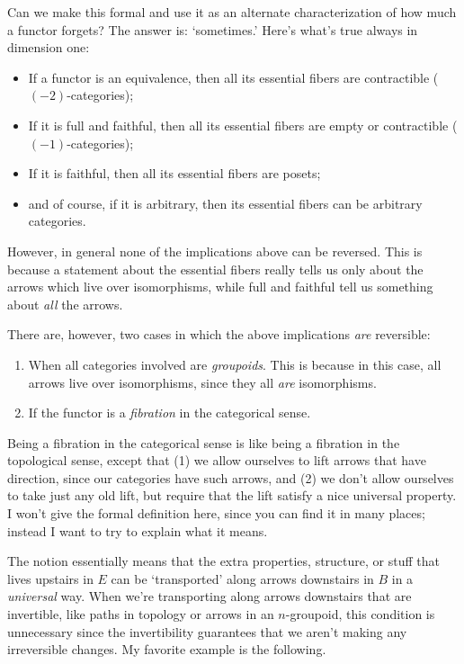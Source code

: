 \documentclass[12pt]{amsart}
\begin{document}
Can we make this formal and use it as an alternate characterization of
how much a functor forgets?  The answer is: `sometimes.'  Here's
what's true always in dimension one:

\begin{itemize}
\item If a functor is an equivalence, then all its essential fibers
  are contractible ($(-2)$-categories);
\item If it is full and faithful, then all its essential fibers are empty
  or contractible ($(-1)$-categories); 
\item If it is faithful, then all its essential fibers are posets;
\item and of course, if it is arbitrary, then its essential fibers can
  be arbitrary categories.
\end{itemize}

However, in general none of the implications above can be reversed.
This is because a statement about the essential fibers really tells us
only about the arrows which live over isomorphisms, while full and
faithful tell us something about \emph{all} the arrows.

There are, however, two cases in which the above implications
\emph{are} reversible:
\begin{enumerate}
\item When all categories involved are \emph{groupoids}.  This is
  because in this case, all arrows live over isomorphisms, since they
  all \emph{are} isomorphisms.
\item If the functor is a \emph{fibration} in the categorical sense.
\end{enumerate}

Being a fibration in the categorical sense is like being a fibration
in the topological sense, except that (1) we allow ourselves to lift
arrows that have direction, since our categories have such arrows, and
(2) we don't allow ourselves to take just any old lift, but require
that the lift satisfy a nice universal property.  I won't give the
formal definition here, since you can find it in many places; instead
I want to try to explain what it means.

The notion essentially means that the extra properties, structure, or
stuff that lives upstairs in $E$ can be `transported' along arrows
downstairs in $B$ in a \emph{universal} way.  When we're transporting
along arrows downstairs that are invertible, like paths in topology or
arrows in an $n$-groupoid, this condition is unnecessary since the
invertibility guarantees that we aren't making any irreversible
changes.  My favorite example is the following.
\end{document}
